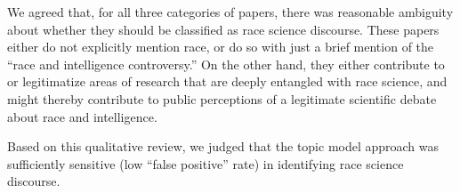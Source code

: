 \documentclass[12pt]{article}
\begin{document}
We agreed that, for all three categories of papers, there was reasonable ambiguity about whether they should be classified as race science discourse. These papers either do not explicitly mention race, or do so with just a brief mention of the ``race and intelligence controversy.'' On the other hand, they either contribute to or legitimatize areas of research that are deeply entangled with race science, and might thereby contribute to public perceptions of a legitimate scientific debate about race and intelligence.

Based on this qualitative review, we judged that the topic model approach was sufficiently sensitive (low ``false positive'' rate) in identifying race science discourse.
\end{document}
